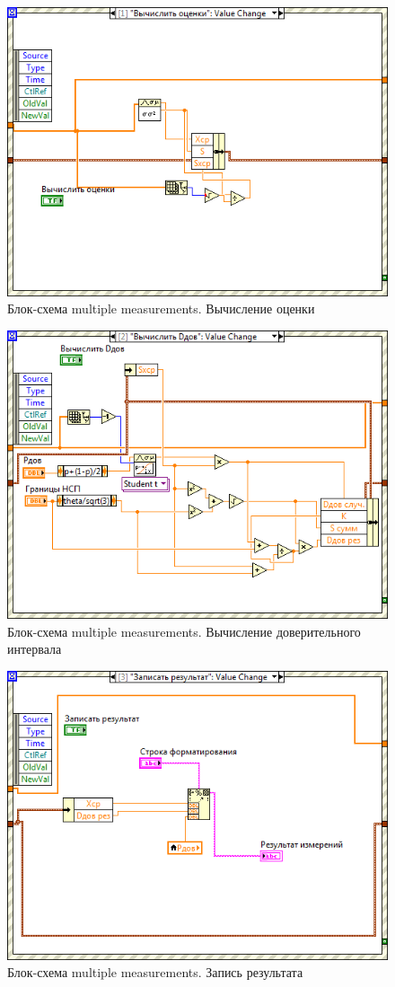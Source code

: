 \documentclass[a4paper,14pt]{article}
\begin{document}
 \begin{figure}[H]
    \centering
    \includegraphics[width=0.7\linewidth]{image/mp_schema_1}
    \caption{Блок-схема multiple measurements. Вычисление оценки}\label{img:mp_schema_calc_score}
\end{figure}
 \begin{figure}[H]
    \centering
    \includegraphics[width=\linewidth]{image/mp_schema_2}
    \caption{Блок-схема multiple measurements. Вычисление доверительного интервала}\label{img:mp_schema_calc_D}
\end{figure}
 \begin{figure}[H]
    \centering
    \includegraphics[width=0.7\linewidth]{image/mp_schema_3}
    \caption{Блок-схема multiple measurements. Запись результата}\label{img:mp_schema_write}
\end{figure}
\end{document}
